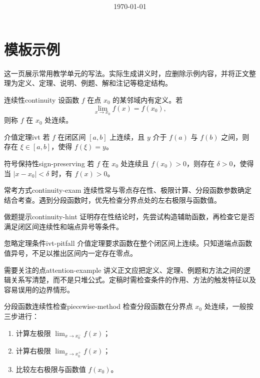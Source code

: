 \documentclass[UTF8,zihao=-4,scheme=chinese,fontset=none]{ctexart}
\title{\bfseries \LectureTitle}
\author{}
\date{\today}
\begin{document}
\maketitle
\tableofcontents

\section{模板示例}

这一页展示常用教学单元的写法。实际生成讲义时，应删除示例内容，并将正文整理为定义、定理、说明、例题、解和注记等稳定结构。

\begin{definition}{连续性}{continuity}
设函数 $f$ 在点 $x_0$ 的某邻域内有定义。若
\[
  \lim_{x\to x_0} f(x)=f(x_0),
\]
则称 $f$ 在 $x_0$ 处连续。
\end{definition}

\begin{theorem}{介值定理}{ivt}
若 $f$ 在闭区间 $[a,b]$ 上连续，且 $y$ 介于 $f(a)$ 与 $f(b)$ 之间，则存在 $\xi\in[a,b]$，使得 $f(\xi)=y$。
\end{theorem}

\begin{lemma}{符号保持性}{sign-preserving}
若 $f$ 在 $x_0$ 处连续且 $f(x_0)>0$，则存在 $\delta>0$，使得当 $|x-x_0|<\delta$ 时，有 $f(x)>0$。
\end{lemma}

\begin{examspot}{常考方式}{continuity-exam}
连续性常与零点存在性、极限计算、分段函数参数确定结合考查。遇到分段函数时，优先检查分界点处的左右极限与函数值。
\end{examspot}

\begin{hint}{做题提示}{continuity-hint}
证明存在性结论时，先尝试构造辅助函数，再检查它是否满足闭区间连续性和端点异号等条件。
\end{hint}

\begin{pitfall}{忽略定理条件}{ivt-pitfall}
介值定理要求函数在整个闭区间上连续。只知道端点函数值异号，不足以推出区间内一定存在零点。
\end{pitfall}

\begin{attention}{需要关注的点}{attention-example}
讲义正文应把定义、定理、例题和方法之间的逻辑关系写清楚，而不是只堆公式。定稿时需检查条件的作用、方法的触发特征以及容易误用的边界情形。
\end{attention}

\begin{method}{分段函数连续性检查}{piecewise-method}
检查分段函数在分界点 $x_0$ 处连续，一般按三步进行：
\begin{enumerate}
  \item 计算左极限 $\lim_{x\to x_0^-}f(x)$；
  \item 计算右极限 $\lim_{x\to x_0^+}f(x)$；
  \item 比较左右极限与函数值 $f(x_0)$。
\end{enumerate}
\end{method}
\end{document}
